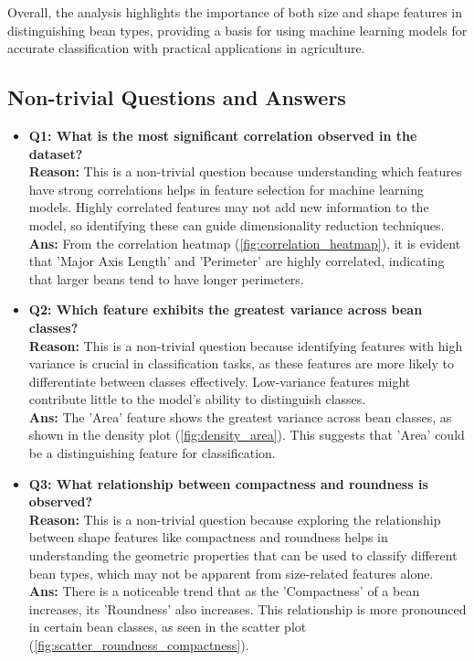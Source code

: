 \documentclass[a4paper,12pt]{article}
\begin{document}
Overall, the analysis highlights the importance of both size and shape features in distinguishing bean types, providing a basis for using machine learning models for accurate classification with practical applications in agriculture.
\newpage

\subsection{Non-trivial Questions and Answers}
\begin{itemize}
    \item \textbf{Q1: What is the most significant correlation observed in the dataset?}\\
    \textbf{Reason:} This is a non-trivial question because understanding which features have strong correlations helps in feature selection for machine learning models. Highly correlated features may not add new information to the model, so identifying these can guide dimensionality reduction techniques.\\
    \textbf{Ans:} From the correlation heatmap (\autoref{fig:correlation_heatmap}), it is evident that 'Major Axis Length' and 'Perimeter' are highly correlated, indicating that larger beans tend to have longer perimeters.

    \item \textbf{Q2: Which feature exhibits the greatest variance across bean classes?}\\
    \textbf{Reason:} This is a non-trivial question because identifying features with high variance is crucial in classification tasks, as these features are more likely to differentiate between classes effectively. Low-variance features might contribute little to the model's ability to distinguish classes.\\
    \textbf{Ans:} The 'Area' feature shows the greatest variance across bean classes, as shown in the density plot (\autoref{fig:density_area}). This suggests that 'Area' could be a distinguishing feature for classification.

    \item \textbf{Q3: What relationship between compactness and roundness is observed?}\\
    \textbf{Reason:} This is a non-trivial question because exploring the relationship between shape features like compactness and roundness helps in understanding the geometric properties that can be used to classify different bean types, which may not be apparent from size-related features alone.\\
    \textbf{Ans:} There is a noticeable trend that as the 'Compactness' of a bean increases, its 'Roundness' also increases. This relationship is more pronounced in certain bean classes, as seen in the scatter plot (\autoref{fig:scatter_roundness_compactness}).


\end{itemize}
\end{document}
